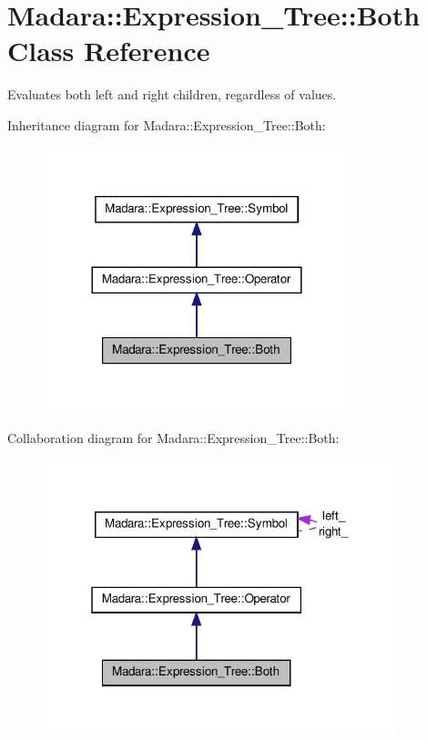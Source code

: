 \hypertarget{classMadara_1_1Expression__Tree_1_1Both}{
\section{Madara::Expression\_\-Tree::Both Class Reference}
\label{db/d81/classMadara_1_1Expression__Tree_1_1Both}
}


Evaluates both left and right children, regardless of values.  




Inheritance diagram for Madara::Expression\_\-Tree::Both:
\nopagebreak
\begin{figure}[H]
\begin{center}
\leavevmode
\includegraphics[width=252pt]{db/d55/classMadara_1_1Expression__Tree_1_1Both__inherit__graph}
\end{center}
\end{figure}


Collaboration diagram for Madara::Expression\_\-Tree::Both:
\nopagebreak
\begin{figure}[H]
\begin{center}
\leavevmode
\includegraphics[width=292pt]{de/ded/classMadara_1_1Expression__Tree_1_1Both__coll__graph}
\end{center}
\end{figure}

